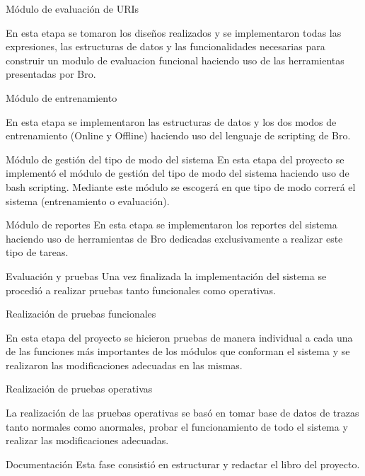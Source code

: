 \begin{legal}
\begin{legal}
\item Módulo de evaluación de URIs 

En esta etapa se tomaron los diseños realizados y se implementaron todas las expresiones, las estructuras de datos y las funcionalidades necesarias para construir un modulo de evaluacion funcional haciendo uso de las herramientas presentadas por Bro. 

\item Módulo de entrenamiento 

En esta etapa se implementaron las estructuras de datos y los dos modos de entrenamiento (Online y Offline) haciendo uso del lenguaje de scripting de Bro.

\item Módulo de gestión del tipo de modo del sistema
En esta etapa del proyecto se implementó el módulo de gestión del tipo de modo del sistema haciendo uso de bash scripting. Mediante este módulo se escogerá en que tipo de modo correrá el sistema (entrenamiento o evaluación).

\item Módulo de reportes
En esta etapa se implementaron los reportes del sistema haciendo uso de herramientas de Bro dedicadas exclusivamente a realizar este tipo de tareas.

\end{legal}
\item Evaluación y pruebas 
Una vez finalizada la implementación del sistema se procedió a realizar pruebas tanto funcionales como operativas.
\begin{legal}
\item Realización de pruebas funcionales

En esta etapa del proyecto se hicieron pruebas de manera individual a cada una de las funciones más importantes de los módulos que conforman el sistema y se realizaron las modificaciones adecuadas en las mismas.

\item Realización de pruebas operativas

La realización de las pruebas operativas se basó en tomar base de datos de trazas tanto normales como anormales, probar el funcionamiento de todo el sistema y realizar las modificaciones adecuadas.
\end{legal}

\item Documentación  
 Esta fase consistió en estructurar y redactar el libro del proyecto.
\end{legal}

